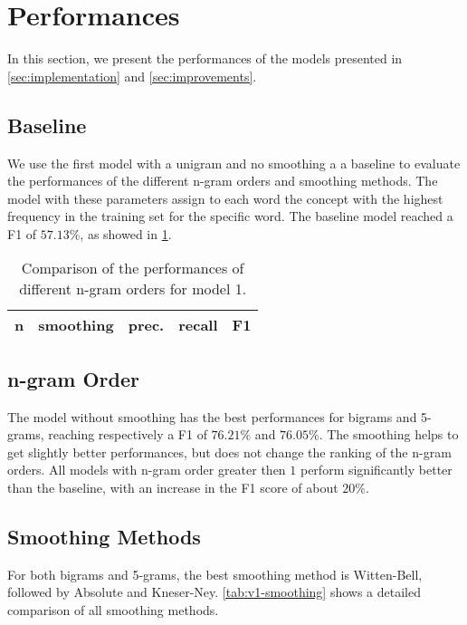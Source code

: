 \section{Performances}
\label{sec:performances}

In this section, we present the performances of the models presented in \cref{sec:implementation} and \ref{sec:improvements}.

\subsection{Baseline}
We use the first model with a unigram and no smoothing a a baseline to evaluate the performances of the different n-gram orders and smoothing methods.
The model with these parameters assign to each word the concept with the highest frequency in the training set for the specific word.
The baseline model reached a F1 of $57.13\%$, as showed in \cref{tab:v1-ngrams}. 

\begin{table}[t!]
	\centering
    \begin{tabular}{ l l l l l }
    	\toprule
    		n & smoothing & prec. & recall & F1 \\
    	\midrule
            
    	\bottomrule
	\end{tabular}
    \caption{Comparison of the performances of different n-gram orders for model 1.}
	\label{tab:v1-ngrams}
\end{table}

\subsection{n-gram Order}
The model without smoothing has the best performances for bigrams and 5-grams, reaching respectively a F1 of $76.21\%$  and $76.05\%$.
The smoothing helps to get slightly better performances, but does not change the ranking of the n-gram orders.
All models with n-gram order greater then $1$ perform significantly better than the baseline, with an increase in the F1 score of about $20\%$.

\subsection{Smoothing Methods}
For both bigrams and 5-grams, the best smoothing method is Witten-Bell, followed by Absolute and Kneser-Ney.
\cref{tab:v1-smoothing} shows a detailed comparison of all smoothing methods.

